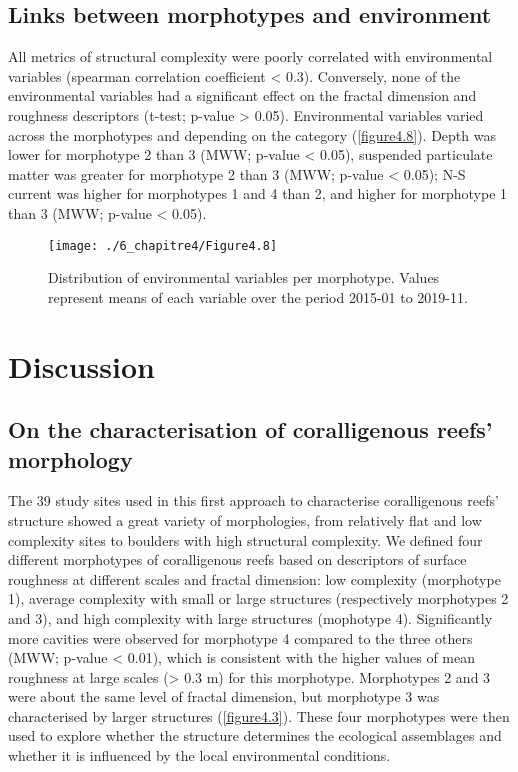 \subsection{Links between morphotypes and environment}\label{chapitre4_3.3}
All metrics of structural complexity were poorly correlated with environmental variables (spearman correlation coefficient < 0.3). Conversely, none of the environmental variables had a significant effect on the fractal dimension and roughness descriptors (t-test; p-value > 0.05). Environmental variables varied across the morphotypes and depending on the category (\autoref{figure4.8}). Depth was lower for morphotype 2 than 3 (MWW; p-value < 0.05), suspended particulate matter was greater for morphotype 2 than 3 (MWW; p-value < 0.05); N-S current was higher for morphotypes 1 and 4 than 2, and higher for morphotype 1 than 3 (MWW; p-value < 0.05).

\begin{figure}[H]
	\begin{center}
	\texttt{[image: ./6\_chapitre4/Figure4.8]}
		\caption[Distribution of environmental variables per morphotype]{Distribution of environmental variables per morphotype. Values represent means of each variable over the period 2015-01 to 2019-11.}
	\label{figure4.8}
\end{center}
\end{figure}


\section{Discussion}\label{chapitre4_4}

\subsection{On the characterisation of coralligenous reefs’ morphology}\label{chapitre4_4.1}
The 39 study sites used in this first approach to characterise coralligenous reefs’ structure showed a great variety of morphologies, from relatively flat and low complexity sites to boulders with high structural complexity. We defined four different morphotypes of coralligenous reefs based on descriptors of surface roughness at different scales and fractal dimension: low complexity (morphotype 1), average complexity with small or large structures (respectively morphotypes 2 and 3), and high complexity with large structures (mophotype 4). Significantly more cavities were observed for morphotype 4 compared to the three others (MWW; p-value < 0.01), which is consistent with the higher values of mean roughness at large scales (> 0.3 m) for this morphotype. Morphotypes 2 and 3 were about the same level of fractal dimension, but morphotype 3 was characterised by larger structures (\autoref{figure4.3}). These four morphotypes were then used to explore whether the structure determines the ecological assemblages and whether it is influenced by the local environmental conditions.

